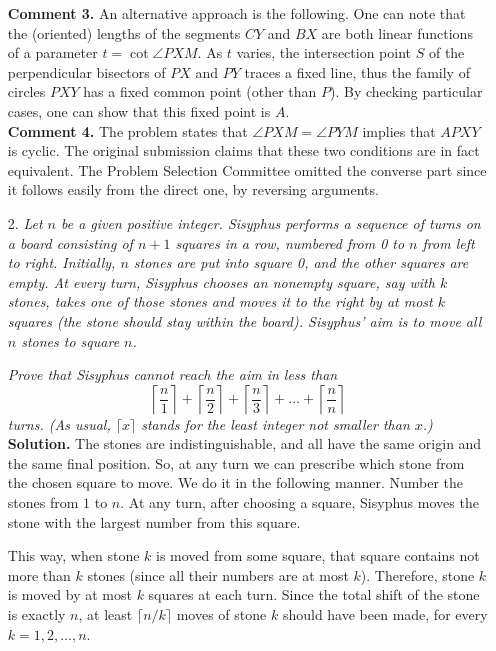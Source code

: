 \documentclass[a4paper, 12pt]{article}
\begin{document}
\begin{enumerate}
\textbf{Comment 3. } An alternative approach is the following. One can note that the (oriented) lengths of the segments $CY$ and $BX$ are both linear functions of a parameter $t = \cot{\angle PXM}$. As $t$ varies, the intersection point $S$ of the perpendicular bisectors of $PX$ and $PY$ traces a fixed line, thus the family of circles $PXY$ has a fixed common point (other than $P$). By checking particular cases, one can show that this fixed point is $A$. \\

\textbf{Comment 4. }  The problem states that $\angle PXM = \angle PYM$ implies that $APXY$ is cyclic. The original submission claims that these two conditions are in fact equivalent. The Problem Selection Committee omitted the converse part since it follows easily from the direct one, by reversing arguments.



\vspace{5mm}
\item[2.]  \textit{Let $n$ be a given positive integer.  Sisyphus performs a sequence of turns on a board consisting of $n+1$ squares in a row, numbered from 0 to $n$ from left to right.  Initially, $n$ stones are put into square 0, and the other squares are empty. At every turn, Sisyphus chooses an nonempty square, say with $k$ stones, takes one of those stones and moves it to the right by at most $k$ squares (the stone should stay within the board). Sisyphus' aim is to move all $n$ stones to square $n$.}

\textit{Prove that Sisyphus cannot reach the aim in less than
 $$\left\lceil \frac{n}{1} \right\rceil + \left\lceil \frac{n}{2} \right\rceil +\left\lceil \frac{n}{3} \right\rceil + \dots + \left\lceil \frac{n}{n} \right\rceil
$$
turns. (As usual, $\lceil x \rceil$ stands for the least integer not smaller than $x$.)
} \\

\textbf{Solution. } The stones are indistinguishable, and all have the same origin and the same final position. So, at any turn we can prescribe which stone from the chosen square to move. We do it in the following manner. Number the stones from $1$ to $n$. At any turn, after choosing a square, Sisyphus moves the stone with the largest number from this square.

This way, when stone $k$ is moved from some square, that square contains not more than $k$ stones (since all their numbers are at most $k$). Therefore, stone $k$ is moved by at most $k$ squares at each turn.  Since the total shift of the stone is exactly $n$, at least $\lceil n/k \rceil$ moves of stone $k$ should have been made, for every $k = 1, 2, \dots, n$.


\end{enumerate}
\end{document}
